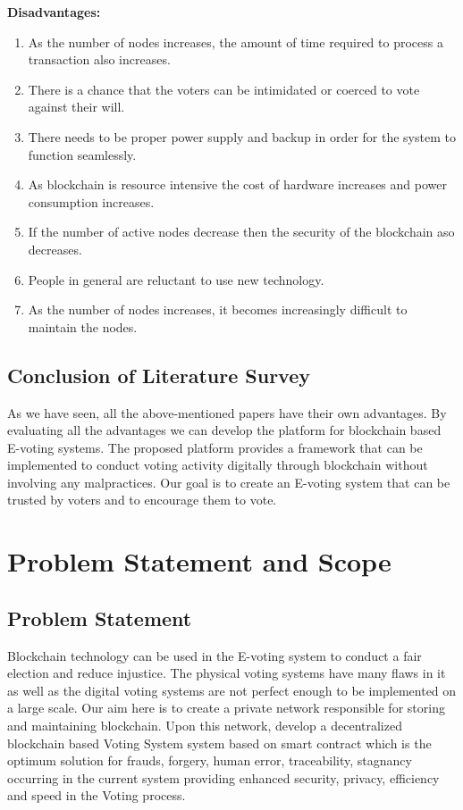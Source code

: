 \documentclass[oneside, 12pt]{book}
\begin{document}
\textbf{Disadvantages:}
\begin{enumerate}
	\item As the number of nodes increases, the amount of time required to process a transaction also increases.
	\item There is a chance that the voters can be intimidated or coerced to vote against their will.
	\item There needs to be proper power supply and backup in order for the system to function seamlessly.
	\item As blockchain is resource intensive the cost of hardware increases and power consumption increases.
	\item If the number of active nodes decrease then the security of the blockchain aso decreases.
	\item People in general are reluctant to use new technology.
	\item As the number of nodes increases, it becomes increasingly difficult to maintain the nodes.
\end{enumerate}
\subsection{Conclusion of Literature Survey}
As we have seen, all the above-mentioned papers have their own advantages. By evaluating all the advantages we can develop the platform for blockchain based E-voting systems. The proposed platform provides a framework that can be implemented to conduct voting activity digitally through blockchain without involving any malpractices. Our goal is to create an E-voting system that can be trusted by voters and to encourage them to vote.
\newpage
\section{Problem Statement and Scope}
\newpage
\subsection{Problem Statement}
Blockchain technology can be used in the E-voting system to conduct a fair election and reduce injustice. The physical voting systems have many flaws in it as well as the digital voting systems are not perfect enough to be implemented on a large scale. Our aim here is to create a private network responsible for storing and maintaining blockchain. Upon this network, develop a decentralized blockchain based Voting System system based on smart contract which is the optimum solution for frauds, forgery, human error, traceability, stagnancy occurring in the current system providing enhanced security, privacy, efficiency and speed in the Voting  process.
\end{document}

